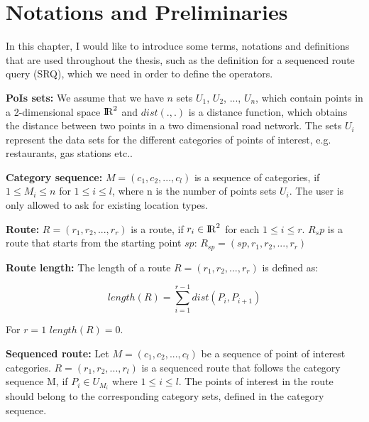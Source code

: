 \chapter{Notations and Preliminaries} 
\label{sec:notes}
In this chapter, I would like to introduce some terms, notations and definitions that are used throughout the thesis, such as the definition for a sequenced route query (SRQ), which we need in order to define the operators. \newline

\textbf{PoIs sets:} We assume that we have $n$ sets $U_1$, $U_2$, ..., $U_n$, which contain points in a 2-dimensional space ${\rm I\!R}^2$ and $dist(., .)$ is a distance function, which obtains the distance between two points in a two dimensional road network. The sets $U_i$ represent the data sets for the different categories of points of interest, e.g. restaurants, gas stations etc.. \newline

\textbf{Category sequence:} $M = (c_1, c_2, ..., c_l)$ is a sequence of categories, if $1 \leq M_i \leq n$ for $1 \leq i \leq l$, where n is the number of points sets $U_i$. The user is only allowed to ask for existing location types. \newline

\textbf{Route:} $R =(r_1, r_2, ..., r_r)$ is a route, if $r_i \in {\rm I\!R}^2$ for each $1 \leq i \leq r$. $R_sp$ is a route that starts from the starting point $sp$: $R_{sp} = (sp, r_1, r_2, ..., r_r)$\newline

\textbf{Route length:} The length of a route $R = (r_1, r_2, ..., r_r)$ is defined as:

\begin{equation}
length(R) = \sum_{i=1}^{r-1} dist(P_i, P_{i+1})
\end{equation}

For $r = 1$ $length(R) = 0$.
\newline

\textbf{Sequenced route:} Let $M = (c_1, c_2, ..., c_l)$ be a sequence of point of interest categories. $R = (r_1, r_2, ..., r_l)$ is a sequenced route that follows the category sequence M, if $P_i \in U_{M_i}$ where $1 \leq i \leq l$. The points of interest in the route should belong to the corresponding category sets, defined in the category sequence. \newline

